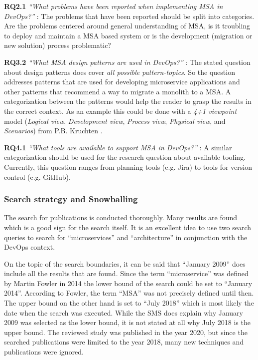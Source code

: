 \textbf{RQ2.1} \textit{``What problems have been reported 
when implementing MSA in DevOps?''} \wsl:
The problems that have been reported should be split
into categories. Are the problems centered around general understanding of
MSA, is it troubling to deploy and maintain a MSA based system or
is the development (migration or new solution) process problematic?

\textbf{RQ3.2} \textit{``What MSA design patterns are used in DevOps?''} \wsl:
The stated question about design patterns does
cover \textit{all possible pattern-topics}. So the question addresses
patterns that are used for developing microservice applications and
other patterns that recommend a way to migrate a monolith to a MSA.
A categorization between the patterns would help the reader to
grasp the results in the correct context. As an example this could be done
with a \textit{4+1 viewpoint} model (\textit{Logical view},
\textit{Development view}, \textit{Process view}, \textit{Physical view},
and \textit{Scenarios}) from P.B. Kruchten \cite{kruchten:Viewmodels}.

\textbf{RQ4.1} \textit{``What tools are available to support MSA in DevOps?''} \wsl:
A similar categorization should be used for the
research question about available tooling. Currently, this question
ranges from planning tools (e.g. Jira) to tools for version control
(e.g. GitHub).

\subsubsection{Search strategy and Snowballing}

The search for publications is conducted thoroughly. Many results
are found which is a good sign for the search itself. It is an excellent
idea to use two search queries to search for ``microservices'' and
``architecture'' in conjunction with the DevOps context.

On the topic of the search boundaries, it can be said that ``January 2009''
does include all the results that are found. Since the term ``microservice''
was defined by Martin Fowler in 2014 \cite{fowler:microservices} the lower
bound of the search could be set to ``January 2014''. According to Fowler,
the term ``MSA'' was not precisely defined until then.
The upper bound on the other hand is set to ``July 2018'' which is most likely
the date when the search was executed. While the SMS does explain
why January 2009 was selected as the lower bound, it is not stated
at all why July 2018 is the upper bound. The reviewed study was published
in the year 2020, but since the searched publications were limited
to the year 2018, many new techniques and publications were ignored.

